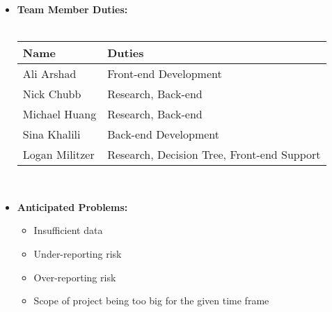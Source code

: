 \documentclass{article}
\begin{document}
\begin{itemize}
    \item \textbf{Team Member Duties:} \\ \\
        \begin{tabularx}{\linewidth}{
        |p{}%
        |p{}|}
        \hline
        \textbf{Name} & \textbf{Duties} \\
        \hline
        Ali Arshad & Front-end Development \\
        \hline
        Nick Chubb & Research, Back-end \\ 
        \hline
        Michael Huang & Research, Back-end \\
        \hline
        Sina Khalili &  Back-end Development\\
        \hline
        Logan Militzer & Research, Decision Tree, Front-end Support \\
        \hline
        \end{tabularx} \\
    
    \item \textbf{Anticipated Problems:} 
    \begin{itemize}
        \item Insufficient data
        \item Under-reporting risk
        \item Over-reporting risk
        \item Scope of project being too big for the given time frame
    \end{itemize}
    

\end{itemize}
\end{document}
